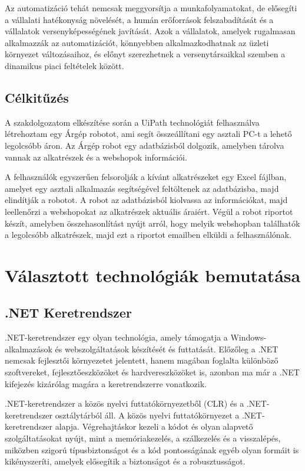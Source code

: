 \documentclass[
]{thesis-ekf}
\theoremstyle{definition}
\theoremstyle{remark}
\begin{document}
Az automatizáció tehát nemcsak meggyorsítja a munkafolyamatokat, de elősegíti a vállalati hatékonyság növelését, a humán erőforrások felszabadítását és a vállalatok versenyképességének javítását. Azok a vállalatok, amelyek rugalmasan alkalmazzák az automatizációt, könnyebben alkalmazkodhatnak az üzleti környezet változásaihoz, és előnyt szerezhetnek a versenytársaikkal szemben a dinamikus piaci feltételek között.


\section*{Célkitűzés}
A szakdolgozatom elkészítése során a UiPath technológiát felhasználva létrehoztam egy Árgép robotot, ami segít összeállítani egy asztali PC-t a lehető legolcsóbb áron. Az Árgép robot egy adatbázisból dolgozik, amelyben tárolva vannak az alkatrészek és a webshopok információi. 

A felhasználók egyszerűen felsorolják a kívánt alkatrészeket egy Excel fájlban, amelyet egy asztali alkalmazás segítségével feltöltenek az adatbázisba, majd elindítják a robotot. A robot az adatbázisból kiolvassa az információkat, majd leellenőrzi a webshopokat az alkatrészek aktuális áraiért. Végül a robot riportot készít, amelyben összehasonlítást nyújt arról, hogy melyik webshopban találhatók a legolcsóbb alkatrészek, majd ezt a riportot emailben elküldi a felhasználónak.


\chapter{Választott technológiák bemutatása}
\section{.NET Keretrendszer}
.NET-keretrendszer egy olyan technológia, amely támogatja a Windows-alkalmazások és webszolgáltatások készítését és futtatását. Előzőleg a .NET nemcsak fejlesztői környezetet jelentett, hanem magában foglalta különböző szoftvereket, fejlesztőeszközöket és hardvereszközöket is, azonban ma már a .NET kifejezés kizárólag magára a keretrendszerre vonatkozik.

.NET-keretrendszer a közös nyelvi futtatókörnyezetből (CLR) és a .NET- keretrendszer osztálytárból áll. A közös nyelvi futtatókörnyezet a .NET- keretrendszer alapja. Végrehajtáskor kezeli a kódot és olyan alapvető szolgáltatásokat nyújt, mint a memóriakezelés, a szálkezelés és a visszalépés, miközben szigorú típusbiztonságot és a kód pontosságának egyéb olyan formáit is kikényszeríti, amelyek elősegítik a biztonságot és a robusztusságot.
\end{document}
